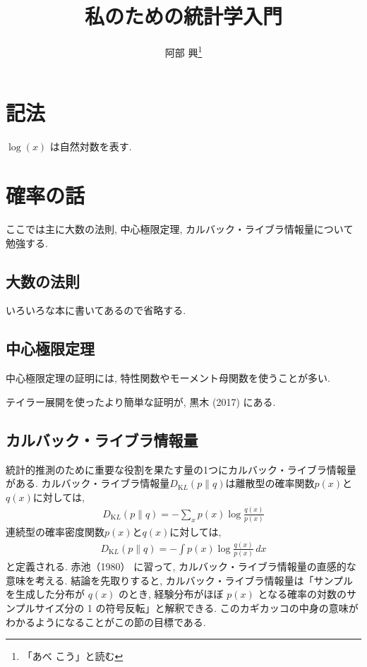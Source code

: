 \documentclass{jarticle}
\title{私のための統計学入門}
\author{阿部 興\footnote{「あべ こう」と読む}}
\begin{document}
\maketitle

\newcommand{\KL}{D_{\mathrm KL}}

\section*{記法}

$\log(x)$ は自然対数を表す.

\section{確率の話}
ここでは主に大数の法則, 中心極限定理, カルバック・ライブラ情報量について勉強する.

\subsection{大数の法則}

いろいろな本に書いてあるので省略する.

\subsection{中心極限定理}

中心極限定理の証明には, 特性関数やモーメント母関数を使うことが多い. 

テイラー展開を使ったより簡単な証明が, 黒木 (2017)\cite{Kuroki2017} にある. 

\subsection{カルバック・ライブラ情報量}
統計的推測のために重要な役割を果たす量の1つにカルバック・ライブラ情報量がある.
カルバック・ライブラ情報量$\KL(p\|q)$は離散型の確率関数$p(x)$と$q(x)$に対しては, 
\begin{align}
\KL(p\|q) = -\sum_{x} p(x) \log \frac{q(x)}{p(x)}
\end{align}
連続型の確率密度関数$p(x)$と$q(x)$に対しては, 
\begin{align}
\KL(p\|q) = -\int p(x) \log \frac{q(x)}{p(x)} \, dx
\end{align}
と定義される. 
赤池（1980）\cite{Akaike1980} に習って, カルバック・ライブラ情報量の直感的な意味を考える. 結論を先取りすると, カルバック・ライブラ情報量は「サンプルを生成した分布が $q(x)$ のとき, 経験分布がほぼ $p(x)$ となる確率の対数のサンプルサイズ分の 1 の符号反転」と解釈できる. このカギカッコの中身の意味がわかるようになることがこの節の目標である.
\end{document}
